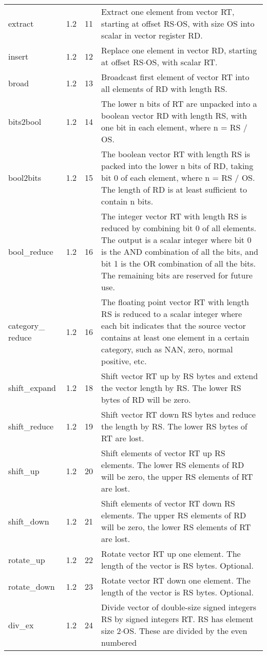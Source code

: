 \documentclass[forwardcom.tex]{subfiles}
\begin{document}
\begin{longtable} {|p{20mm}|p{10mm}|p{8mm}|p{75mm}|}
extract       & 1.2 & 11 & Extract one element from vector RT, starting at offset RS$\cdot$OS, with size OS into scalar in vector register RD. \\
insert        & 1.2 & 12 & Replace one element in vector RD, starting at offset RS$\cdot$OS, with scalar RT. \\
broad         & 1.2 & 13 & Broadcast first element of vector RT into all elements of RD with length RS. \\
bits2bool     & 1.2 & 14 & The lower n bits of RT are unpacked into a boolean vector RD with length RS, with one bit in each element, where n = RS / OS. \\
bool2bits     & 1.2 & 15 & The boolean vector RT with length RS is packed into the lower n bits of RD, taking bit 0 of each element, where n = RS / OS. The
length of RD is at least sufficient to contain n bits. \\
bool\_reduce  & 1.2 & 16 & The integer vector RT with length RS is reduced by combining bit 0 of all elements. The output is a scalar integer where bit 0 is the
AND combination of all the bits, and bit 1 is the OR combination of
all the bits. The remaining bits are reserved for future use. \\
category\_ reduce & 1.2 & 16 & The floating point vector RT with length RS is reduced to a scalar integer where each bit indicates that the source vector contains at least one element in a certain category, such as NAN, zero, normal positive, etc. \\
shift\_expand & 1.2 & 18 & Shift vector RT up by RS bytes and extend the vector length by RS. The lower RS bytes of RD will be zero. \\
shift\_reduce & 1.2 & 19 & Shift vector RT down RS bytes and reduce the length by RS. The lower RS bytes of RT are lost. \\
shift\_up     & 1.2 & 20 & Shift elements of vector RT up RS elements. The lower RS elements of RD will be zero, the upper RS elements of RT are lost. \\
shift\_down   & 1.2 & 21 & Shift elements of vector RT down RS elements. The upper RS
elements of RD will be zero, the lower RS elements of RT are lost. \\
rotate\_up  & 1.2 & 22 & Rotate vector RT up one element. The length of the vector is RS bytes. Optional. \\
rotate\_down  & 1.2 & 23 & Rotate vector RT down one element. The length of the vector is RS bytes. Optional. \\
div\_ex    & 1.2 & 24 & Divide vector of double-size signed integers RS by signed integers RT. RS has element size 2$\cdot$OS. These are divided by the even numbered

\end{longtable}
\end{document}
